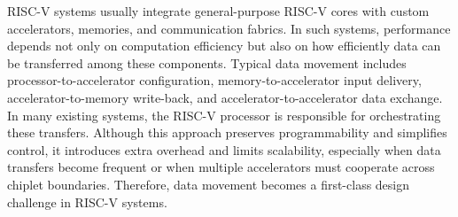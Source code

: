 RISC-V systems usually integrate general-purpose RISC-V cores with custom accelerators, memories, and communication fabrics. In such systems, performance depends not only on computation efficiency but also on how efficiently data can be transferred among these components. Typical data movement includes processor-to-accelerator configuration, memory-to-accelerator input delivery, accelerator-to-memory write-back, and accelerator-to-accelerator data exchange. In many existing systems, the RISC-V processor is responsible for orchestrating these transfers. Although this approach preserves programmability and simplifies control, it introduces extra overhead and limits scalability, especially when data transfers become frequent or when multiple accelerators must cooperate across chiplet boundaries. Therefore, data movement becomes a first-class design challenge in RISC-V systems.